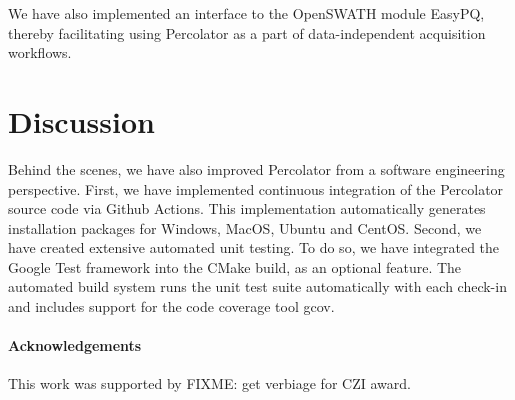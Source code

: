 \documentclass{article}
\newcommand{\fixme}[1]{\color{red}FIXME: #1\color{black}}
\begin{document}
We have also implemented an interface to the OpenSWATH module EasyPQ, thereby facilitating using Percolator as a part of data-independent acquisition
workflows.

\section*{Discussion}

Behind the scenes, we have also improved Percolator from a software engineering perspective.
First, we have implemented continuous integration of the Percolator source code via Github Actions.
This implementation automatically generates installation packages for Windows, MacOS, Ubuntu and CentOS.
Second, we have created extensive automated unit testing.
To do so, we have integrated the Google Test framework into the CMake build, as an optional feature.
The automated build system runs the unit test suite automatically with each check-in and includes support for the code coverage tool gcov.

\paragraph{Acknowledgements}

This work was supported by \fixme{get verbiage for CZI award.}



\end{document}
